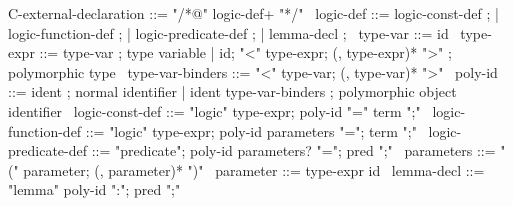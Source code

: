 \begin{syntax}
  C-external-declaration ::= "/*@" logic-def+ "*/"
  \
  logic-def ::= logic-const-def ;
          | logic-function-def ;
          | logic-predicate-def ;
          | lemma-decl ;
  \
  type-var ::= id
  \
  type-expr ::= type-var ; type variable
  | id;
    "<" type-expr;
    (, type-expr)* ">" ; polymorphic type
  \
  type-var-binders ::= "<" type-var;
                       (, type-var)* ">"
  \
  poly-id ::= ident ; normal identifier
  | ident type-var-binders ; polymorphic object identifier
  \
  logic-const-def ::= "logic" type-expr;
    poly-id "=" term ";"
  \
  logic-function-def ::= "logic" type-expr;
  poly-id parameters "=";
  term ";"
  \
  logic-predicate-def ::=
  "predicate";
  poly-id parameters? "=";
  pred ";"
  \
  parameters ::= "(" parameter;
                 (, parameter)* ")"
  \
  parameter ::= type-expr id
  \
  lemma-decl ::= "lemma" poly-id ":";
                   pred ";"
\end{syntax}
